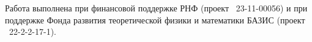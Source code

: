 



Работа выполнена при финансовой поддержке РНФ (проект \textnumero~23-11-00056) и при поддержке  Фонда развития теоретической физики и математики БАЗИС  (проект \textnumero~22-2-2-17-1).

%



